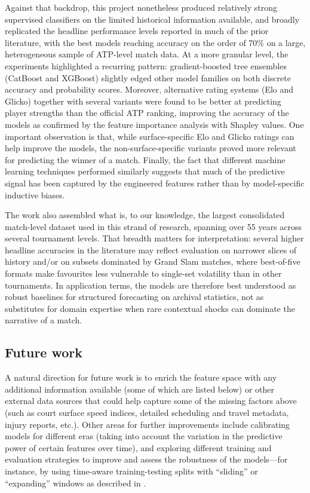 Against that backdrop, this project nonetheless produced relatively strong supervised classifiers
on the limited historical information available, and broadly replicated the headline performance
levels reported in much of the prior literature, with the best models reaching accuracy on the order
of 70\% on a large, heterogeneous sample of ATP-level match data. At a more granular level, the
experiments highlighted a recurring pattern: gradient-boosted tree ensembles (CatBoost and XGBoost)
slightly edged other model families on both discrete accuracy and probability scores.
Moreover, alternative rating systems (Elo and Glicko) together with several variants were found to
be better at predicting player strengths than the official ATP ranking, improving the
accuracy of the models as confirmed by the feature importance analysis with Shapley values. One
important observation is that, while surface-specific Elo and Glicko ratings can help improve the
models, the non-surface-specific variants proved more relevant for predicting the winner of a match.
Finally, the fact that different machine learning techniques performed similarly suggests that much
of the predictive signal has been captured by the engineered features rather than by model-specific
inductive biases.

The work also assembled what is, to our knowledge, the largest consolidated match-level dataset used
in this strand of research, spanning over 55 years across several tournament levels. That breadth
matters for interpretation: several higher headline accuracies in the literature may reflect
evaluation on narrower slices of history and/or on subsets dominated by Grand Slam matches, where
best-of-five formats make favourites less vulnerable to single-set volatility than in other
tournaments. In application terms, the models are therefore best understood as robust baselines for
structured forecasting on archival statistics, not as substitutes for domain expertise when rare
contextual shocks can dominate the narrative of a match.

\subsection{Future work}

A natural direction for future work is to enrich the feature space with any additional information
available (some of which are listed below) or other external data sources that could help capture
some of the missing factors above (such as court surface speed indices, detailed scheduling and
travel metadata, injury reports, etc.). Other areas for further improvements include calibrating
models for different eras (taking into account the variation in the predictive power of certain
features over time), and exploring different training and evaluation strategies to improve and
assess the robustness of the models---for instance, by using time-aware training-testing splits with
``sliding'' or ``expanding'' windows as described in \textcite{buhamra_2025-2}.

